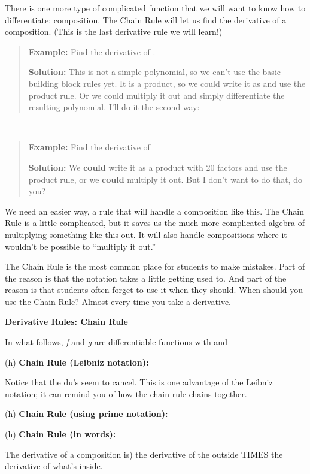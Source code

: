 There is one more type of complicated function that we will want to know
how to differentiate: composition. The Chain Rule will let us find the
derivative of a composition. (This is the last derivative rule we will
learn!)

\begin{quote}
\textbf{Example:} Find the derivative of .

\textbf{Solution:} This is not a simple polynomial, so we can't use the
basic building block rules yet. It is a product, so we could write it as
and use the product rule. Or we could multiply it out and simply
differentiate the resulting polynomial. I'll do it the second way:
\end{quote}

\textbf{\\
}

\begin{quote}
\textbf{Example:} Find the derivative of

\textbf{Solution:} We \textbf{could} write it as a product with 20
factors and use the product rule, or we \textbf{could} multiply it out.
But I don't want to do that, do you?
\end{quote}

We need an easier way, a rule that will handle a composition like this.
The Chain Rule is a little complicated, but it saves us the much more
complicated algebra of multiplying something like this out. It will also
handle compositions where it wouldn't be possible to ``multiply it
out.''

The Chain Rule is the most common place for students to make mistakes.
Part of the reason is that the notation takes a little getting used to.
And part of the reason is that students often forget to use it when they
should. When should you use the Chain Rule? Almost every time you take a
derivative.

\textbf{Derivative Rules: Chain Rule}

In what follows, \emph{f} and \emph{g} are differentiable functions with
and

(h) \textbf{Chain Rule (Leibniz notation):}

Notice that the du's seem to cancel. This is one advantage of the
Leibniz notation; it can remind you of how the chain rule chains
together.

(h) \textbf{Chain Rule (using prime notation):}

(h) \textbf{Chain Rule (in words): }

The derivative of a composition is) the derivative of the outside TIMES
the derivative of what's inside.

